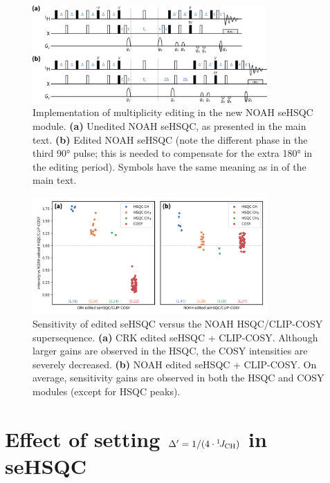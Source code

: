 \begin{figure}
    \centering
    \includegraphics[width=0.8\textwidth]{./figures/mult_edit.png}
    \caption{
        Implementation of multiplicity editing in the new NOAH seHSQC module.
        \textbf{(a)} Unedited NOAH seHSQC, as presented in the main text.
        \textbf{(b)} Edited NOAH seHSQC (note the different phase in the third \proton{} \ang{90} pulse; this is needed to compensate for the extra \ang{180} in the editing period).
        Symbols have the same meaning as in  of the main text.
    }
    \label{fig:edited_sehsqc_pprog}
\end{figure}

\begin{figure}
    \centering
    \includegraphics[width=0.8\textwidth]{./figures/edited_sn_comp.png}
    \caption{
        Sensitivity of edited seHSQC versus the NOAH HSQC/CLIP-COSY supersequence.
        \andro{}
        \textbf{(a)} CRK edited seHSQC + CLIP-COSY.
        Although larger gains are observed in the HSQC, the COSY intensities are severely decreased.
        \textbf{(b)} NOAH edited seHSQC + CLIP-COSY.
        On average, sensitivity gains are observed in both the HSQC and COSY modules (except for HSQC  peaks).
    }
    \label{fig:edited_sn_comp}
\end{figure}

\section{Effect of setting \texorpdfstring{$\Delta' = 1/(4\cdot\onejch)$}{Delta' = 1/(4*1JCH)} in seHSQC}

